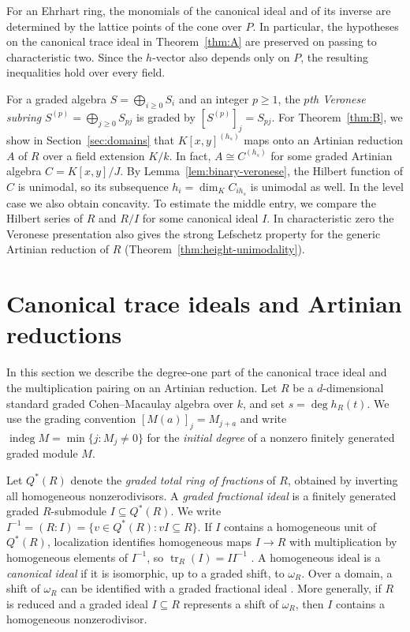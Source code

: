 \documentclass[a4paper,11pt]{amsart}
\DeclareMathOperator{\tr}{tr}
\DeclareMathOperator{\indeg}{indeg}
\newcommand{\kk}{k}
\theoremstyle{definition}
\begin{document}
For an Ehrhart ring, the monomials of the canonical ideal and of its inverse are determined by the lattice points of the cone over $P$. In particular, the hypotheses on the canonical trace ideal in Theorem~\ref{thm:A} are preserved on passing to characteristic two. Since the $h$-vector also depends only on $P$, the resulting inequalities hold over every field.

For a graded algebra $S=\bigoplus_{i\geq0}S_i$ and an integer $p\geq1$, the \emph{$p$th Veronese subring} $S^{(p)}=\bigoplus_{j\geq0}S_{pj}$ is graded by $[S^{(p)}]_j=S_{pj}$. For Theorem~\ref{thm:B}, we show in Section~\ref{sec:domains} that $K[x,y]^{(h_s)}$ maps onto an Artinian reduction $A$ of $R$ over a field extension $K/\kk$. In fact, $A\cong C^{(h_s)}$ for some graded Artinian algebra $C=K[x,y]/J$. By Lemma~\ref{lem:binary-veronese}, the Hilbert function of $C$ is unimodal, so its subsequence $h_i=\dim_K C_{ih_s}$ is unimodal as well. In the level case we also obtain concavity. To estimate the middle entry, we compare the Hilbert series of $R$ and $R/I$ for some canonical ideal $I$. In characteristic zero the Veronese presentation also gives the strong Lefschetz property for the generic Artinian reduction of $R$ (Theorem~\ref{thm:height-unimodality}).

\section{Canonical trace ideals and Artinian reductions}\label{sec:canonical}

In this section we describe the degree-one part of the canonical trace ideal and the multiplication pairing on an Artinian reduction. Let $R$ be a $d$-dimensional standard graded Cohen--Macaulay algebra over $\kk$, and set $s=\deg h_R(t)$. We use the grading convention $[M(a)]_j=M_{j+a}$ and write $\indeg M=\min\{j:M_j\ne0\}$ for the \emph{initial degree} of a nonzero finitely generated graded module $M$.

Let $Q^*(R)$ denote the \emph{graded total ring of fractions} of $R$, obtained by inverting all homogeneous nonzerodivisors. A \emph{graded fractional ideal} is a finitely generated graded $R$-submodule $I\subseteq Q^*(R)$. We write $I^{-1}=(R:I)=\{v\in Q^*(R):vI\subseteq R\}$. If $I$ contains a homogeneous unit of $Q^*(R)$, localization identifies homogeneous maps $I\to R$ with multiplication by homogeneous elements of $I^{-1}$, so $\tr_R(I)=II^{-1}$ \cite[Lemma~2.6]{M26}. A homogeneous ideal is a \emph{canonical ideal} if it is isomorphic, up to a graded shift, to $\omega_R$. Over a domain, a shift of $\omega_R$ can be identified with a graded fractional ideal \cite[Proposition~3.3.18]{BH98}. More generally, if $R$ is reduced and a graded ideal $I\subseteq R$ represents a shift of $\omega_R$, then $I$ contains a homogeneous nonzerodivisor.
\end{document}
